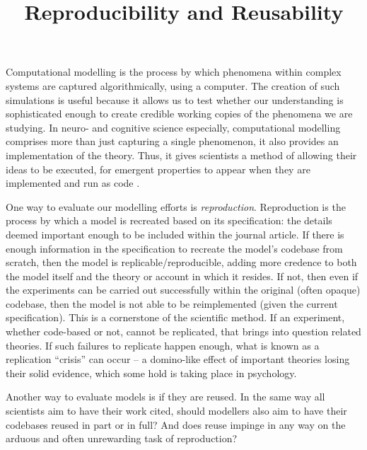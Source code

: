 \documentclass[jou]{apa6}
\title{Reproducibility and Reusability}
\begin{document}
\maketitle

Computational modelling is the process by which phenomena within complex systems are captured algorithmically, using a computer.
The creation of such simulations is useful because it allows us to test whether our understanding is sophisticated enough to create credible working copies of the phenomena we are studying.
In neuro- and cognitive science especially, computational modelling comprises more than just capturing a single phenomenon, it also provides an implementation of the theory.
Thus, it gives scientists a method of allowing their ideas to be executed, for emergent properties to appear when they are implemented and run as code \cite{mcclelland09}.

One way to evaluate our modelling efforts is \emph{reproduction}.
Reproduction is the process by which a model is recreated based on its specification: the details deemed important enough to be included within the journal article.
If there is enough information in the specification to recreate the model's codebase from scratch, then the model is replicable/reproducible, adding more credence to both the model itself and the theory or account in which it resides.
If not, then even if the experiments can be carried out successfully within the original (often opaque) codebase, then the model is not able to be reimplemented (given the current specification).
This is a cornerstone of the scientific method.
If an experiment, whether code-based or not, cannot be replicated, that brings into question related theories.
If such failures to replicate happen enough, what is known as a replication ``crisis'' can occur -- a domino-like effect of important theories losing their solid evidence, which some hold is taking place in psychology.

Another way to evaluate models is if they are reused.
In the same way all scientists aim to have their work cited, should modellers also aim to have their codebases reused in part or in full?
And does reuse impinge in any way on the arduous and often unrewarding task of reproduction?  
\end{document}
